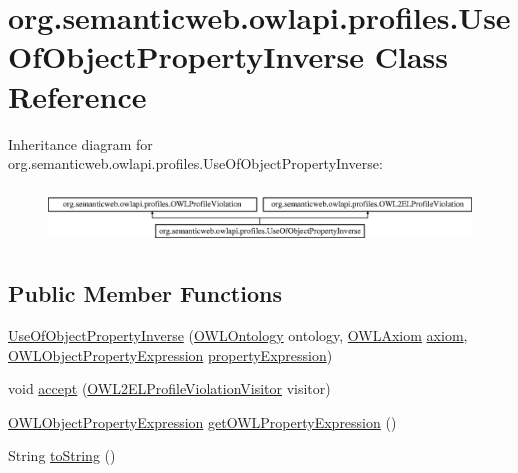 \hypertarget{classorg_1_1semanticweb_1_1owlapi_1_1profiles_1_1_use_of_object_property_inverse}{\section{org.\-semanticweb.\-owlapi.\-profiles.\-Use\-Of\-Object\-Property\-Inverse Class Reference}
\label{classorg_1_1semanticweb_1_1owlapi_1_1profiles_1_1_use_of_object_property_inverse}
}
Inheritance diagram for org.\-semanticweb.\-owlapi.\-profiles.\-Use\-Of\-Object\-Property\-Inverse\-:\begin{figure}[H]
\begin{center}
\leavevmode
\includegraphics[height=1.521739cm]{classorg_1_1semanticweb_1_1owlapi_1_1profiles_1_1_use_of_object_property_inverse}
\end{center}
\end{figure}
\subsection*{Public Member Functions}
\begin{DoxyCompactItemize}
\item 
\hyperlink{classorg_1_1semanticweb_1_1owlapi_1_1profiles_1_1_use_of_object_property_inverse_a1541d750ccc116cf64d9423ec5284a84}{Use\-Of\-Object\-Property\-Inverse} (\hyperlink{interfaceorg_1_1semanticweb_1_1owlapi_1_1model_1_1_o_w_l_ontology}{O\-W\-L\-Ontology} ontology, \hyperlink{interfaceorg_1_1semanticweb_1_1owlapi_1_1model_1_1_o_w_l_axiom}{O\-W\-L\-Axiom} \hyperlink{classorg_1_1semanticweb_1_1owlapi_1_1profiles_1_1_o_w_l_profile_violation_aa7c8e8910ed3966f64a2c003fb516214}{axiom}, \hyperlink{interfaceorg_1_1semanticweb_1_1owlapi_1_1model_1_1_o_w_l_object_property_expression}{O\-W\-L\-Object\-Property\-Expression} \hyperlink{classorg_1_1semanticweb_1_1owlapi_1_1profiles_1_1_use_of_object_property_inverse_a2e2de856b7aff63500b72f8cf72df240}{property\-Expression})
\item 
void \hyperlink{classorg_1_1semanticweb_1_1owlapi_1_1profiles_1_1_use_of_object_property_inverse_a552c22f4007aeffb4d9726e693112439}{accept} (\hyperlink{interfaceorg_1_1semanticweb_1_1owlapi_1_1profiles_1_1_o_w_l2_e_l_profile_violation_visitor}{O\-W\-L2\-E\-L\-Profile\-Violation\-Visitor} visitor)
\item 
\hyperlink{interfaceorg_1_1semanticweb_1_1owlapi_1_1model_1_1_o_w_l_object_property_expression}{O\-W\-L\-Object\-Property\-Expression} \hyperlink{classorg_1_1semanticweb_1_1owlapi_1_1profiles_1_1_use_of_object_property_inverse_abd656092f2e576af5ee3ea8c81d9bca4}{get\-O\-W\-L\-Property\-Expression} ()
\item 
String \hyperlink{classorg_1_1semanticweb_1_1owlapi_1_1profiles_1_1_use_of_object_property_inverse_ad60570f69d82c5afa3cad21239d3a861}{to\-String} ()
\end{DoxyCompactItemize}
